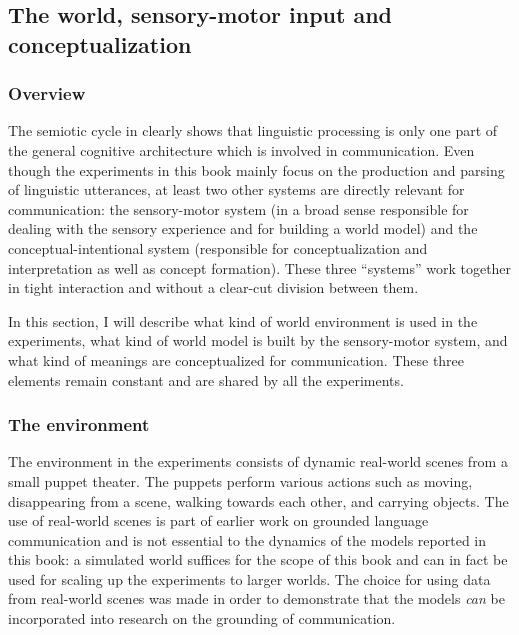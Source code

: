 \subsection{The world, sensory-motor input and conceptualization}
\label{s:world}


\subsubsection{Overview}

The semiotic cycle in  clearly shows that linguistic processing is only one part of the general cognitive architecture which is involved in communication. Even though the experiments in this book mainly focus on the production and parsing of linguistic utterances, at least two other systems are directly relevant for communication: the sensory-motor system (in a broad sense responsible for dealing with the sensory experience and for building a world model) and the conceptual-intentional system (responsible for conceptualization and interpretation as well as concept formation). These three ``systems'' work together in tight interaction and without a clear-cut division between them.

In this section, I will describe what kind of world environment is used in the experiments, what kind of world model is built by the sensory-motor system, and what kind of meanings are conceptualized for communication. These three elements remain constant and are shared by all the experiments.


\subsubsection{The environment}
 The environment in the experiments consists of dynamic real-world scenes from a small puppet theater. The puppets perform various actions such as moving, disappearing from a scene, walking towards each other, and carrying objects. The use of real-world scenes is part of earlier work on grounded language communication \citep{steels02simulating, steels03shared} and is not essential to the dynamics of the models reported in this book: a simulated world suffices for the scope of this book and can in fact be used for scaling up the experiments to larger worlds. The choice for using data from real-world scenes was made in order to demonstrate that the models {\em can} be incorporated into research on the grounding of communication.

